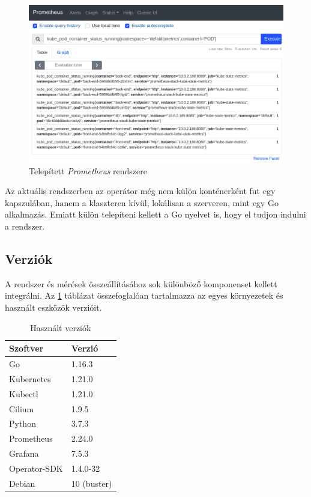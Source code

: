 \begin{figure}[!ht]
\centering
\includegraphics[width=150mm, keepaspectratio]{figures/prometheus_example.png}
\caption{Telepített \textit{Prometheus} rendszere}
\label{fig:prometheus_example}
\end{figure}

Az aktuális rendszerben az operátor még nem külön konténerként fut egy kapszulában, hanem a klaszteren kívül, lokálisan a szerveren, mint egy Go alkalmazás. Emiatt külön telepíteni kellett a Go nyelvet is, hogy el tudjon indulni a rendszer.

\subsection{Verziók}
A rendszer és mérések összeállításához sok különböző komponenset kellett integrálni. Az \ref{tab:versions} táblázat összefoglalóan tartalmazza az egyes környezetek és használt eszközök verzióit. 

\begin{table}[ht]
\centering
  \begin{tabular}{l l}
	  Szoftver 		& Verzió \\
    \hline
      Go 			& 1.16.3 \\ 
      Kubernetes 	& 1.21.0 \\ 
      Kubectl 		& 1.21.0 \\
      Cilium 		& 1.9.5 \\
      Python 		& 3.7.3 \\ 
      Prometheus 	& 2.24.0 \\ 
      Grafana 		& 7.5.3 \\ 
      Operator-SDK 	& 1.4.0-32 \\ 
      Debian 		& 10 (buster)  \\ 
  \end{tabular}
  
  \caption{Használt verziók}
\label{tab:versions}
\end{table}


